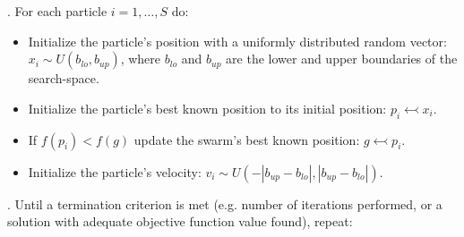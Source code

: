 \documentclass[10pt,letterpaper]{article}
\begin{document}
. For each particle $i = 1,\ldots, S$ do:
\begin{itemize}

\item
Initialize the particle's position with a uniformly distributed random vector: $x_i \sim U(b_{lo}, b_{up})$, where $b_{lo}$ and $b_{up}$ are the lower and upper boundaries of the search-space.

\item
Initialize the particle's best known position to its initial position: $p_i \leftarrowtail x_i$.

\item
If $f(p_i)<f(g)$ update the swarm's best known position: $g \leftarrowtail p_i$.

\item
Initialize the particle's velocity: $v_i \sim U(-|b_{up}-b_{lo}|, |b_{up}-b_{lo}|)$.

\end{itemize}
. Until a termination criterion is met (e.g. number of iterations performed, or a solution with adequate objective function value found), repeat:
\end{document}
